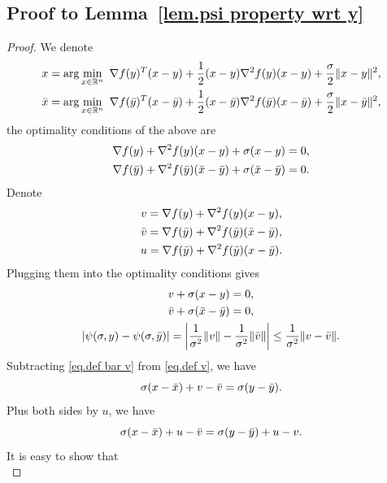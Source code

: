 \documentclass{mcom-l}
\numberwithin{equation}{section}
\begin{document}
\subsection*{Proof to Lemma~\ref{lem.psi property wrt y}}
\begin{proof}
    We denote
    \begin{gather*}
        x = \arg\min_{x\in \mathbb{R}^n} \ \nabla f(y)^T(x-y) +\frac{1}{2}(x-y)\nabla ^2 f(y)(x-y) +\frac{\sigma}{2}\|x-y\|^2,\\
        \Bar{x} = \arg\min_{x\in \mathbb{R}^n} \ \nabla f(\Bar{y})^T(x-\Bar{y}) +\frac{1}{2}(x-\Bar{y})\nabla ^2 f(\Bar{y})(x-\Bar{y}) +\frac{\sigma}{2}\|x-\Bar{y}\|^2,
    \end{gather*}
    the optimality conditions of the above are
    \begin{gather*}
        \nabla f(y) + \nabla ^2 f(y)(x-y) +\sigma(x-y)=0,\\
        \nabla f(\Bar{y})+\nabla ^2 f(\Bar{y})(\Bar{x}-\Bar{y})+\sigma(\Bar{x}-\Bar{y})=0.
    \end{gather*}
    Denote
    \begin{gather*}
        v = \nabla f(y) + \nabla ^2 f(y)(x-y),\\
        \Bar{v} =  \nabla f(\Bar{y})+\nabla ^2 f(\Bar{y})(\Bar{x}-\Bar{y}),\\
        u = \nabla f(\Bar{y})+\nabla ^2 f(\Bar{y})(x-\Bar{y}).
    \end{gather*}
    Plugging them into the optimality conditions gives
    \begin{gather}
        \label{eq.def v}
        v+\sigma(x-y)=0,\\
        \label{eq.def bar v}
        \Bar{v}+\sigma(\Bar{x}-\Bar{y})=0,\\
        \label{eq.target distance initial}
        \left \vert \psi(\sigma,y)-\psi(\sigma,\Bar{y}) \right\vert= \left \vert\frac{1}{\sigma^2}\|v\| -\frac{1}{\sigma^2}\|\Bar{v}\|\right\vert\leq \frac{1}{\sigma^2}\|v-\Bar{v}\|.
    \end{gather}
    Subtracting \eqref{eq.def bar v} from \eqref{eq.def v}, we have
    \begin{equation*}
        \sigma(x-\Bar{x})+v -\Bar{v} = \sigma(y-\Bar{y}).
    \end{equation*}
    Plus both sides by $u$, we have
    \begin{equation*}
        \sigma(x-\Bar{x})+u-\Bar{v} = \sigma(y-\Bar{y})+u-v.
    \end{equation*}
    It is easy to show that
    \begin{equation*}

\end{equation*}
\end{proof}
\end{document}
